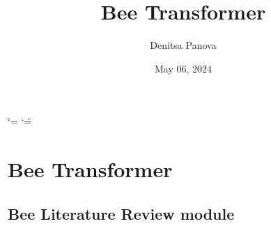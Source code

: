 \documentclass[letterpaper,10pt,english]{sphinxmanual}
\title{Bee Transformer}
\date{May 06, 2024}
\author{Denitsa Panova}
\begin{document}
\ifdefined\shorthandoff
  \ifnum\catcode`\=\string=\active\shorthandoff{=}\fi
  \ifnum\catcode`\"=\active{}\fi
\fi

\pagestyle{empty}
\sphinxmaketitle
\pagestyle{plain}
\sphinxtableofcontents
\pagestyle{normal}
\label{\detokenize{index::doc}}


\sphinxstepscope


\chapter{Bee Transformer}
\label{\detokenize{modules:bee-transformer}}\label{\detokenize{modules::doc}}
\sphinxstepscope


\section{Bee Literature Review module}
\label{\detokenize{BeeLitReview:module-BeeLitReview}}\label{\detokenize{BeeLitReview:bee-literature-review-module}}\label{\detokenize{BeeLitReview::doc}}
\end{document}
